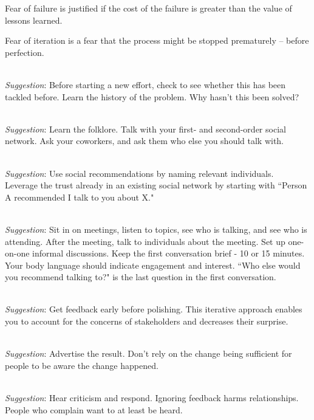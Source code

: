 Fear of failure is justified if the cost of the failure is greater than the value of lessons learned.

Fear of iteration is a fear that the process might be stopped prematurely -- before perfection.

\ \\
\textit{Suggestion}: Before starting a new effort, check to see whether this has been tackled before.
%
%
Learn the history of the problem. Why hasn't this been solved?

\ \\
\textit{Suggestion}: Learn the folklore. Talk with your first- and second-order social network.
Ask your coworkers, and ask them who else you should talk with.

\ \\
\textit{Suggestion}: Use social recommendations by naming relevant individuals.\\
Leverage the trust already in an existing social network by starting with ``Person A recommended I talk to you about X."


\ \\
\textit{Suggestion}: Sit in on meetings, listen to topics, see who is talking, and see who is attending. After the meeting, talk to individuals about the meeting. Set up one-on-one informal discussions. Keep the first conversation brief - 10 or 15 minutes. Your body language should indicate engagement and interest. ``Who else would you recommend talking to?" is the last question in the first conversation.

\ \\
\textit{Suggestion}: Get feedback early before polishing. This iterative approach enables you to account for the concerns of stakeholders and decreases their surprise.

\ \\
\textit{Suggestion}: Advertise the result. Don't rely on the change being sufficient for people to be aware the change happened.

\ \\
\textit{Suggestion}: Hear criticism and respond. Ignoring feedback harms relationships. People who complain want to at least be heard. 


